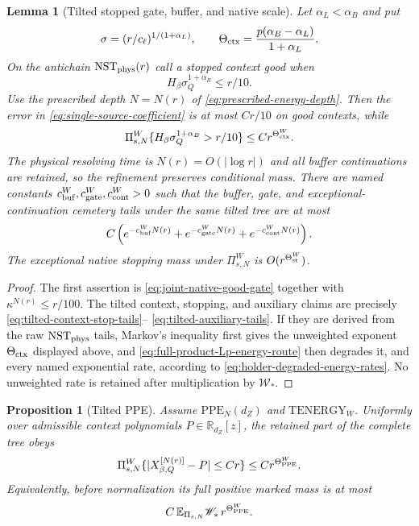 \documentclass[11pt]{article}
\newtheorem{proposition}[theorem]{Proposition}
\newtheorem{lemma}[theorem]{Lemma}
\begin{document}
\begin{lemma}[Tilted stopped gate, buffer, and native scale]
\label{lem:gate-buffer}
Let $\alpha_L<\alpha_B$ and put
\begin{equation}
\label{eq:native-energy-scale}
 \sigma=(r/c_\ell)^{1/(1+\alpha_L)},\qquad
 \Theta_{\rm ctx}=\frac{p(\alpha_B-\alpha_L)}{1+\alpha_L}.
\end{equation}
On the antichain $\mathrm{NST}_{\rm phys}(r)$ call a stopped context good
when
\begin{equation}
\label{eq:joint-native-good-gate}
 H_\beta\sigma_Q^{1+\alpha_B}\le r/10.
\end{equation}
Use the prescribed depth $N=N(r)$ of
\eqref{eq:prescribed-energy-depth}.  Then the error in
\eqref{eq:single-source-coefficient} is at most $Cr/10$ on good contexts,
while
\begin{equation}
\label{eq:bad-context-native-scale}
 \Pi_{s,N}^{W}
 \{H_\beta\sigma_Q^{1+\alpha_B}>r/10\}
 \le Cr^{\Theta_{\rm ctx}^{W}}.
\end{equation}
The physical resolving time is $N(r)=O(|\log r|)$ and all buffer
continuations are retained, so the refinement preserves conditional mass.
There are named constants
$c_{\rm buf}^{W},c_{\rm gate}^{W},c_{\rm cont}^{W}>0$ such that the
buffer, gate, and exceptional-continuation cemetery tails under the same
tilted tree are at most
\begin{equation}
\label{eq:named-energy-tails}
 C\left(e^{-c_{\rm buf}^{W}N(r)}+e^{-c_{\rm gate}^{W}N(r)}
 +e^{-c_{\rm cont}^{W}N(r)}\right).
\end{equation}
The exceptional native stopping mass under $\Pi_{s,N}^{W}$ is
$O(r^{\Theta_{\rm st}^{W}})$.
\end{lemma}

\begin{proof}
The first assertion is \eqref{eq:joint-native-good-gate} together with
$\kappa^{N(r)}\le r/100$.  The tilted context, stopping, and auxiliary
claims are precisely
\eqref{eq:tilted-context-stop-tails}--
\eqref{eq:tilted-auxiliary-tails}.  If they are derived from the raw
$\mathrm{NST}_{\rm phys}$ tails, Markov's inequality first gives the
unweighted exponent $\Theta_{\rm ctx}$ displayed above, and
\eqref{eq:full-product-Lp-energy-route} then degrades it, and every named
exponential rate, according to
\eqref{eq:holder-degraded-energy-rates}.  No unweighted rate is retained
after multiplication by $\mathscr W_*$.
\end{proof}

\begin{proposition}[Tilted PPE]
\label{prop:physical-legal-child}
Assume $\mathrm{PPE}_{N}(d_Z)$ and $\mathrm{TENERGY}_{W}$.  Uniformly over
admissible context polynomials $P\in\mathbb R_{d_Z}[z]$, the retained part of
the complete tree obeys
\begin{equation}
\label{eq:local-clean-sublevel}
 \Pi_{s,N}^{W}
 \{|X^{[N(r)]}_{\beta,Q}-P|\le Cr\}
 \le Cr^{\Theta_{\rm PPE}^{W}}.
\end{equation}
Equivalently, before normalization its full positive marked mass is at most
\[
 C\,\mathbb E_{\Pi_{s,N}}\mathscr W_*\,r^{\Theta_{\rm PPE}^{W}}.
\]
\end{proposition}
\end{document}
